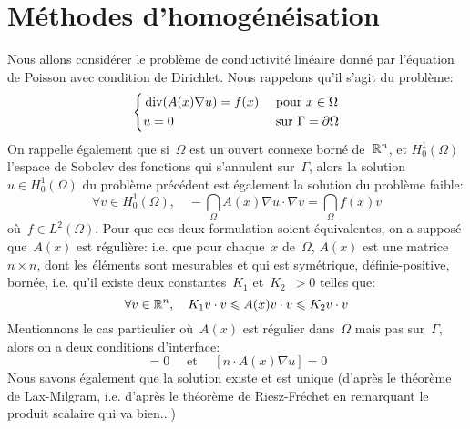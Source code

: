 \medskip
\section{Méthodes d'homogénéisation}

Nous allons considérer le problème de conductivité linéaire donné par l'équation de Poisson avec condition de Dirichlet. Nous rappelons qu'il s'agit du problème:
\begin{equation}
\left\{
\begin{aligned}
&\operatorname{div}(A(x)\nabla u) = f(x)&&\text{ pour } x\in\Omega\\
&u=0 &&\text{ sur } \Gamma=\partial\Omega
\end{aligned}
\right.
\end{equation}
On rappelle également que si~$\Omega$ est un ouvert connexe borné de~$\mathbb R^n$, et $H_0^1(\Omega)$ l'espace de Sobolev des fonctions qui s'annulent sur~$\Gamma$, alors la solution $u\in H_0^1(\Omega)$ du problème précédent est également la solution du problème faible:
\begin{equation}
\forall v\in H_0^1(\Omega),\quad -\dint_\Omega A(x)\nabla u\cdot\nabla v = \dint_\Omega f(x)v
\end{equation}
où~$f\in L^2(\Omega)$.
Pour que ces deux formulation soient équivalentes, on a supposé que~$A(x)$ est régulière: i.e. que pour chaque~$x$ de~$\Omega$, $A(x)$ est une matrice~$n\times n$, dont les éléments sont mesurables et qui est symétrique, définie-positive, bornée, i.e. qu'il existe deux constantes~$K_1$ et~$K_2$~$>0$ telles que:
\begin{equation}\forall v\in\mathbb R^n,\quad K_1 v\cdot v \leqslant A(x) v\cdot v \leqslant K_2 v\cdot v\end{equation}
Mentionnons le cas particulier où~$A(x)$ est régulier dans~$\Omega$ mais pas sur~$\Gamma$, alors on a deux conditions d'interface:
\begin{equation}
[u]=0 \quad\text{ et }\quad [n\cdot A(x)\nabla u]=0
\end{equation}
Nous savons également que la solution existe et est unique (d'après le théorème de Lax-Milgram, i.e. d'après le théorème de Riesz-Fréchet en remarquant le produit scalaire qui va bien...)


